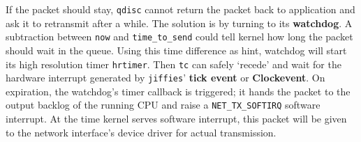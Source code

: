 \documentclass{acm_proc_article-sp}
\begin{document}
If the packet should stay, \texttt{qdisc} cannot return the packet back to application and ask it to retransmit after a while.
The solution is by turning to its \textbf{watchdog}.
A subtraction between \texttt{now} and \texttt{time\_to\_send} could tell kernel how long the packet should wait in the queue.
Using this time difference as hint, watchdog will start its high resolution timer \texttt{hrtimer}\cite{Hrtimer}.
Then \texttt{tc} can safely `recede' and wait for the hardware interrupt generated by \texttt{jiffies}' \textbf{tick event} or \textbf{Clockevent}\cite{Clockevent}.
On expiration, the watchdog's timer callback is triggered;
it hands the packet to the output backlog of the running CPU and raise a \texttt{NET\_TX\_SOFTIRQ} software interrupt.
At the time kernel serves software interrupt, this packet will be given to the network interface's device driver for actual transmission.
\end{document}
